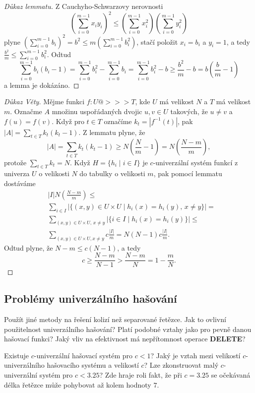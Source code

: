 \documentclass[a4paper,12pt]{article}
\begin{document}
\begin{proof}[Důkaz lemmatu]Z Cauchyho-Schwarzovy nerovnosti 
$$(\sum_{i=0}^{m-1}x_iy_i)^2\le (\sum_{i=0}^{m-1}x^2_i)(\sum_{i=0}^{
m-1}y_i^2)$$
plyne $(\sum_{i=0}^{m-1}b_i)^2=b^2\le m(\sum_{i=0}^{m-1}b_i^2)$, stačí položit 
$x_i=b_i$ a $y_i=1$, a tedy $\frac {b^2}m\le\sum_{i=0}^{m-1}b_i^2$. Odtud
$$\sum_{i=0}^{m-1}b_i(b_i-1)=\sum_{i=0}^{m-1}b_i^2-\sum_{i=0}^{m-
1}b_i=\sum_{i=0}^{m-1}b_i^2-b\ge\frac {b^2}m-b=b(\frac bm-1)$$
a lemma je dokázáno.
\end{proof}

\begin{proof}[Důkaz Věty]Mějme funkci $f:U@>>>T$, kde $U$ má 
velikost $N$ a $T$ má velikost $m$. Označme $A$ množinu 
uspořádaných dvojic $u,v\in U$ takových, že $u\ne v$ a $
f(u)=f(v)$.
Když pro $t\in T$ označíme $k_t=|f^{-1}(t)|$, pak $|A|=
\sum_{t\in T}k_t(k_t-1)$.
Z lemmatu plyne, že 
$$|A|=\sum_{t\in T}k_t(k_t-1)\ge N(\frac Nm-1)=N(\frac {N-m}m),$$
protože $\sum_{t\in T}k_t=N$.\newline 
Když $H=\{h_i\mid i\in I\}$ je $c$-univerzální systém funkcí z univerza $
U$ o 
velikosti $N$ do tabulky o velikosti $m$, pak pomocí 
lemmatu dostáváme 
\begin{align*}&|I|N(\frac {N-m}m)\le\\
&\sum_{i\in I}|\{(x,y)\in U\times U\mid h_i(x)=h_i(y),\,x\ne y\}|
=\\
&\sum_{(x,y)\in U\times U,\,x\ne y}|\{i\in I\mid h_i(x)=h_i(y)\}|
\le\\
&\sum_{(x,y)\in U\times U,x\ne y}c\frac {|I|}m=N(N-1)c\frac {|I|}
m.\end{align*}
Odtud plyne, že $N-m\le c(N-1)$, a tedy 
$$c\ge\frac {N-m}{N-1}>\frac {N-m}N=1-\frac mN.$$
\end{proof}

\subsection{
Problémy univerzálního hašování
}

Použít jiné metody na řešení kolizí než 
separované řetězce. Jak to ovlivní použitelnost 
univerzálního hašování? Platí podobné vztahy jako pro 
pevně danou hašovací funkci? Jaký vliv na efektivnost 
má nepřítomnost operace {\bf DELETE}?

Existuje $c$-univerzální hašovací systém pro 
$c<1$? Jaký je vztah mezi velikostí $c$-univerzální\-ho 
hašovacího systému a velikostí $c$? Lze zkonstruovat 
malý $c$-univerzální systém pro $c<3.25$? Zde hraje roli 
fakt, že při $c=3.25$ se očekávaná délka řetězce 
může pohybovat až kolem hodnoty $7$.
\end{document}
